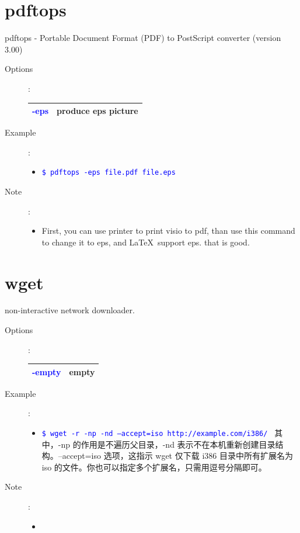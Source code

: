 \documentclass[a4paper,12pt,twoside]{book}
\newcommand{\linuxcommand}[1]{\texttt{\textcolor{blue}{\$ #1 \Pisymbol{psy}{191}}}}
\newcommand{\op}[1]{\textcolor{blue}{-#1}}
\begin{document}
\begin{CJK*}{UTF8}{song}
\section{pdftops}
	pdftops - Portable Document Format (PDF) to PostScript converter (version 3.00)
	\begin{description}
	\item[Options]:\\
		\begin{tabular}{c|p{}}
		\hline
		\op{eps} & produce eps picture\\
		\hline
		\end{tabular}
	\item[Example]:
		\begin{itemize}
		\item \linuxcommand{pdftops -eps file.pdf file.eps}
		\end{itemize}
	\item[Note]:
		\begin{itemize}
		\item First, you can use printer to print visio to pdf, than use this command to change
		it to eps, and \LaTeX\ support eps. that is good.
		\end{itemize}
	\end{description}
\section{wget}
	non-interactive network downloader.
	\begin{description}
	\item[Options]:\\
		\begin{tabular}{c|p{}}
		\hline
		\op{empty} & empty \\
		\hline
		\end{tabular}
	\item[Example]:
		\begin{itemize}
		\item \linuxcommand{wget -r -np -nd --accept=iso http://example.com/i386/} 其中，-np 的作用是不遍历父目录，-nd 表示不在本机重新创建目录结构。--accept=iso 选项，这指示 wget 仅下载 i386 目录中所有扩展名为 iso 的文件。你也可以指定多个扩展名，只需用逗号分隔即可。
		\end{itemize}
	\item[Note]:
		\begin{itemize}
		\item
		\end{itemize}
	\end{description}


\end{CJK*}
\end{document}
